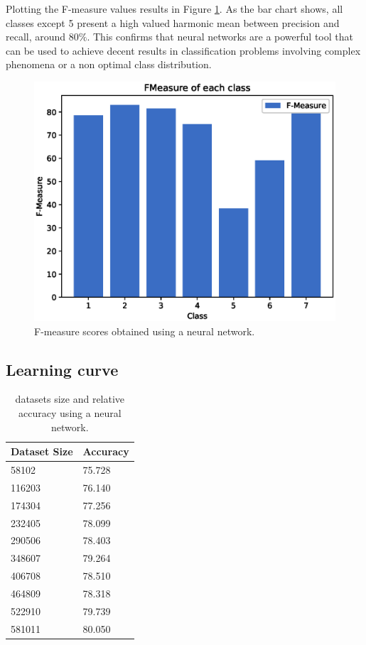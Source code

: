 \documentclass[a4paper, 10pt]{article}
\begin{document}
Plotting the F-measure values results in Figure \ref{fig:nn_fmeasure}. As the bar chart shows, all classes except 5 present a high valued harmonic mean between precision and recall, around $80\%$. This confirms that neural networks are a powerful tool that can be used to achieve decent results in classification problems involving complex phenomena or a non optimal class distribution.

\begin{figure}[H]
 \centering
 \includegraphics[width=0.8\linewidth]{pictures/nn_fmeasure.eps}
 \caption{F-measure scores obtained using a neural network.}
 \label{fig:nn_fmeasure}
\end{figure}


\subsection{Learning curve}

\begin{table}[H]
\centering
\begin{tabular}{|l|l|}
\hline
\textbf{Dataset Size} & \textbf{Accuracy}\\\hline
58102 & 75.728\\\hline
116203 & 76.140\\\hline
174304 & 77.256\\\hline
232405 & 78.099\\\hline
290506 & 78.403\\\hline
348607 & 79.264\\\hline
406708 & 78.510\\\hline
464809 & 78.318\\\hline
522910 & 79.739\\\hline
581011 & 80.050\\\hline
\end{tabular}
\caption{datasets size and relative accuracy using a neural network.}
\label{tab:nn_learning}
\end{table}
\end{document}
